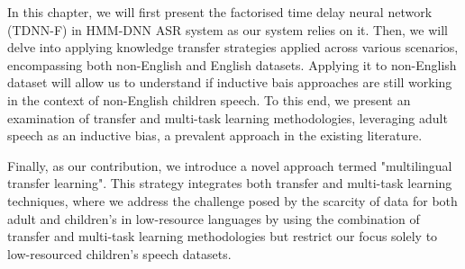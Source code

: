 In this chapter, we will first present the factorised time delay neural network (TDNN-F) in HMM-DNN ASR system as our system relies on it. Then, we will delve into applying knowledge transfer strategies applied across various scenarios, encompassing both non-English and English datasets. Applying it to non-English dataset will allow us to understand if inductive bais approaches are still working in the context of non-English children speech. To this end, we present an examination of transfer and multi-task learning methodologies, leveraging adult speech as an inductive bias, a prevalent approach in the existing literature. 

Finally, as our contribution, we introduce a novel approach termed "multilingual transfer learning". This strategy integrates both transfer and multi-task learning techniques, where we address the challenge posed by the scarcity of data for both adult and children's in low-resource languages by using the combination of transfer and multi-task learning methodologies but restrict our focus solely to low-resourced  children's speech datasets.

